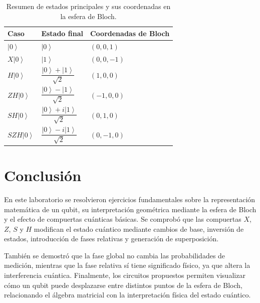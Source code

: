 \documentclass[12pt,a4paper]{article}
\newcommand{\ket}[1]{\left|#1\right\rangle}
\begin{document}
\begin{table}[h!]
\centering
\begin{tabular}{lll}
\toprule
\textbf{Caso} & \textbf{Estado final} & \textbf{Coordenadas de Bloch} \\
\midrule
\(\ket{0}\) & \(\ket{0}\) & \((0,0,1)\) \\
\(X\ket{0}\) & \(\ket{1}\) & \((0,0,-1)\) \\
\(H\ket{0}\) & \(\dfrac{\ket{0}+\ket{1}}{\sqrt{2}}\) & \((1,0,0)\) \\
\(ZH\ket{0}\) & \(\dfrac{\ket{0}-\ket{1}}{\sqrt{2}}\) & \((-1,0,0)\) \\
\(SH\ket{0}\) & \(\dfrac{\ket{0}+i\ket{1}}{\sqrt{2}}\) & \((0,1,0)\) \\
\(SZH\ket{0}\) & \(\dfrac{\ket{0}-i\ket{1}}{\sqrt{2}}\) & \((0,-1,0)\) \\
\bottomrule
\end{tabular}
\caption{Resumen de estados principales y sus coordenadas en la esfera de Bloch.}
\end{table}

\section{Conclusión}

En este laboratorio se resolvieron ejercicios fundamentales sobre la representación matemática de un qubit, su interpretación geométrica mediante la esfera de Bloch y el efecto de compuertas cuánticas básicas. Se comprobó que las compuertas \(X\), \(Z\), \(S\) y \(H\) modifican el estado cuántico mediante cambios de base, inversión de estados, introducción de fases relativas y generación de superposición.

También se demostró que la fase global no cambia las probabilidades de medición, mientras que la fase relativa sí tiene significado físico, ya que altera la interferencia cuántica. Finalmente, los circuitos propuestos permiten visualizar cómo un qubit puede desplazarse entre distintos puntos de la esfera de Bloch, relacionando el álgebra matricial con la interpretación física del estado cuántico.
\end{document}
